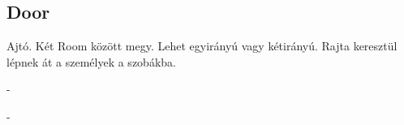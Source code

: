 \subsection{Door}
\begin{class-template-responsibility}
    Ajtó. Két Room között megy. Lehet egyirányú vagy kétirányú. Rajta keresztül lépnek át a személyek a szobákba.
\end{class-template-responsibility}
\begin{class-template-interface} -
\end{class-template-interface}
\begin{class-template-baseclass} -
\end{class-template-baseclass}
\begin{class-template-attribute}
\end{class-template-attribute}
